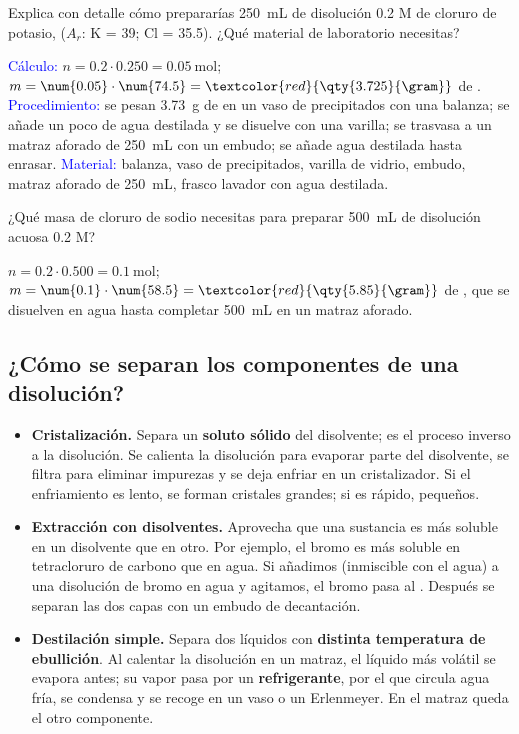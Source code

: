 \begin{exercise}
    Explica con detalle cómo prepararías \qty{250}{\mL} de disolución \num{0.2} M de cloruro de potasio,  (\(A_r\): K = 39; Cl = \num{35.5}). ¿Qué material de laboratorio necesitas?
    \begin{solu}
        \textcolor{blue}{Cálculo:} \(n = \num{0.2} \cdot \num{0.250} = \qty{0.05}{\mol}\); \(m = \num{0.05} \cdot \num{74.5} = \textcolor{red}{\qty{3.725}{\gram}}\) de .
        \textcolor{blue}{Procedimiento:} se pesan \qty{3.73}{\gram} de  en un vaso de precipitados con una balanza; se añade un poco de agua destilada y se disuelve con una varilla; se trasvasa a un matraz aforado de \qty{250}{\mL} con un embudo; se añade agua destilada hasta enrasar.
        \textcolor{blue}{Material:} balanza, vaso de precipitados, varilla de vidrio, embudo, matraz aforado de \qty{250}{\mL}, frasco lavador con agua destilada.
    \end{solu}
\end{exercise}

\begin{exercise}
    ¿Qué masa de cloruro de sodio necesitas para preparar \qty{500}{\mL} de disolución acuosa \num{0.2} M?
    \begin{solu}
        \(n = \num{0.2} \cdot \num{0.500} = \qty{0.1}{\mol}\); \(m = \num{0.1} \cdot \num{58.5} = \textcolor{red}{\qty{5.85}{\gram}}\) de , que se disuelven en agua hasta completar \qty{500}{\mL} en un matraz aforado.
    \end{solu}
\end{exercise}

\subsection{¿Cómo se separan los componentes de una disolución?}

\begin{itemize}
    \item \textbf{Cristalización.} Separa un \textbf{soluto sólido} del disolvente; es el proceso inverso a la disolución. Se calienta la disolución para evaporar parte del disolvente, se filtra para eliminar impurezas y se deja enfriar en un cristalizador. Si el enfriamiento es lento, se forman cristales grandes; si es rápido, pequeños.
    \item \textbf{Extracción con disolventes.} Aprovecha que una sustancia es más soluble en un disolvente que en otro. Por ejemplo, el bromo es más soluble en tetracloruro de carbono que en agua. Si añadimos  (inmiscible con el agua) a una disolución de bromo en agua y agitamos, el bromo pasa al . Después se separan las dos capas con un embudo de decantación.
    \item \textbf{Destilación simple.} Separa dos líquidos con \textbf{distinta temperatura de ebullición}. Al calentar la disolución en un matraz, el líquido más volátil se evapora antes; su vapor pasa por un \textbf{refrigerante}, por el que circula agua fría, se condensa y se recoge en un vaso o un Erlenmeyer. En el matraz queda el otro componente.
\end{itemize}

